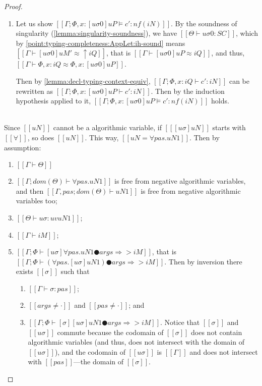 \begin{proof}
\begin{caseof}
\begin{enumerate}
                \item Let us show $[[Γ; Φ, x:[uσ0]uP ⊨ c' : nf(iN)]]$.
                    By the soundness of singularity 
                    (\cref{lemma:singularity-soundness}),
                    we have $[[ Θ ⊢ uσ0 : SC ]]$,
                    which by \ref{point:typing-completeness:AppLet:ih-sound}
                    means $[[Γ ⊢ [uσ0]uM' ≈ ↑iQ]]$,
                    that is $[[Γ ⊢ [uσ0]uP ≈ iQ]]$, 
                    and thus, $[[Γ ⊢ Φ, x:iQ ≈ Φ, x:[uσ0]uP]]$.

                    Then by \cref{lemma:decl-typing-context-equiv},
                    $[[Γ; Φ, x:iQ ⊢ c' : iN]]$ can be rewritten as
                    $[[Γ; Φ, x:[uσ0]uP ⊢ c' : iN]]$.
                    Then by the induction hypothesis applied to it, 
                    $[[Γ; Φ, x:[uσ0]uP ⊨ c' : nf(iN)]]$ holds.
            \end{enumerate}

        \item {}\\
            Since $[[uN]]$ cannot be a algorithmic variable,  
            if $[[ [uσ]uN ]]$ starts with $[[∀]]$,
            so does $[[uN]]$. This way,
            $[[uN = ∀pas.uN1]]$.
            Then by assumption:
            \begin{enumerate}
                \item $[[Γ ⊢ Θ]]$
                \item $[[Γ; dom(Θ) ⊢  ∀pas.uN1]]$ is free from negative algorithmic variables, 
                    and then $[[Γ, pas; dom(Θ) ⊢  uN1]]$ is free from negative algorithmic variables too;
                \item $[[Θ ⊢ uσ : uv uN1]]$;
                \item $[[Γ ⊢ iM]]$;
                \item $[[Γ; Φ ⊢ [uσ]∀pas.uN1 ● args ⇒> iM]]$, 
                    \label{point:typing-completeness-forall-app-inversion}
                    that is $[[Γ; Φ ⊢ (∀pas.[uσ]uN1) ● args ⇒> iM]]$.
                    Then by inversion there exists $[[σ]]$ such that 
                    \begin{enumerate}
                        \item $[[Γ ⊢ σ : {pas}]]$;
                        \item $[[args ≠ ·]]$ and $[[pas ≠ ·]]$; and
                        \item $[[Γ ; Φ ⊢ [σ][uσ]uN1 ● args ⇒> iM]]$.
                            \label{point:typing-completeness-forall-app-inversion-2}
                            Notice that $[[σ]]$ and $[[uσ]]$ commute because 
                            the codomain of $[[σ]]$ does not contain
                            algorithmic variables (and thus, does not intersect with 
                            the domain of $[[uσ]]$), and the codomain of $[[uσ]]$ is 
                            $[[Γ]]$ and does not intersect with $[[pas]]$---the domain of $[[σ]]$.


\end{enumerate}
\end{enumerate}
\end{caseof}
\end{proof}
